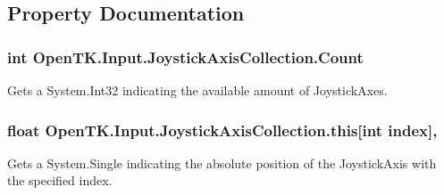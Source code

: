 \subsection{Property Documentation}
\hypertarget{class_open_t_k_1_1_input_1_1_joystick_axis_collection_a32a9980bbfb26d9672393aa41ea6f7c0}{
\subsubsection[{Count}]{\setlength{\rightskip}{0pt plus 5cm}int Open\-T\-K.\-Input.\-Joystick\-Axis\-Collection.\-Count\hspace{0.3cm}{\ttfamily [get]}}}\label{class_open_t_k_1_1_input_1_1_joystick_axis_collection_a32a9980bbfb26d9672393aa41ea6f7c0}


Gets a System.\-Int32 indicating the available amount of Joystick\-Axes. 

\hypertarget{class_open_t_k_1_1_input_1_1_joystick_axis_collection_a71e33c41bc7cb899a68883d205fbc98c}{
\subsubsection[{this[int index]}]{\setlength{\rightskip}{0pt plus 5cm}float Open\-T\-K.\-Input.\-Joystick\-Axis\-Collection.\-this\mbox{[}int index\mbox{]}\hspace{0.3cm}{\ttfamily [get]}, {\ttfamily [set]}}}\label{class_open_t_k_1_1_input_1_1_joystick_axis_collection_a71e33c41bc7cb899a68883d205fbc98c}


Gets a System.\-Single indicating the absolute position of the Joystick\-Axis with the specified index. 


